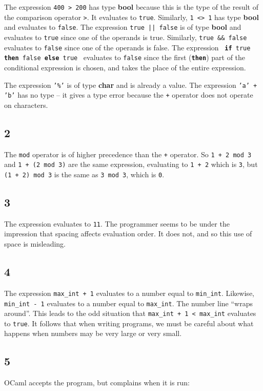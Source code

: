 \documentclass[]{book}
\begin{document}
The expression \texttt{400 > 200} has type \textsf{\textbf{bool}} because this is the type of the result of the comparison operator \texttt{>}. It evaluates to \texttt{true}. Similarly, \texttt{1 <> 1} has type \textsf{\textbf{bool}} and evaluates to \texttt{false}. The expression \texttt{true || false} is of type \textbf{\textsf{bool}} and evaluates to \texttt{true} since one of the operands is true. Similarly, \texttt{true \&\& false} evaluates to \texttt{false} since one of the operands is false. The expression \ \texttt{\textbf{if} true \textbf{then} false \textbf{else} true} \ evaluates to \texttt{false} since the first (\texttt{\textbf{then}}) part of the conditional expression is chosen, and takes the place of the entire expression.

The expression \texttt{'\%'} is of type \textbf{\textsf{char}} and is already a value. The expression \texttt{'a' + 'b'} has no type -- it gives a type error because the \texttt{+} operator does not operate on characters.

\subsection*{2}
The \texttt{mod} operator is of higher precedence than the \texttt{+} operator. So \texttt{1 + 2 mod 3} and \texttt{1 + (2 mod 3)} are the same expression, evaluating to \texttt{1 + 2} which is \texttt{3}, but \texttt{(1 + 2) mod 3} is the same as \texttt{3 mod 3}, which is \texttt{0}.

\subsection*{3}
The expression evaluates to \texttt{11}. The programmer seems to be under the  impression that spacing affects evaluation order. It does not, and so this use of space is misleading.

\subsection*{4}
The expression \texttt{max\_int + 1} evaluates to a number equal to \texttt{min\_int}. Likewise, \texttt{min\_int - 1} evaluates to a number equal to \texttt{max\_int}. The number line ``wraps around''. This leads to the odd situation that \texttt{max\_int + 1 < max\_int} evaluates to \texttt{true}. It follows that when writing programs, we must be careful about what happens when numbers may be very large or very small.

\subsection*{5}
OCaml accepts the program, but complains when it is run:
\end{document}
